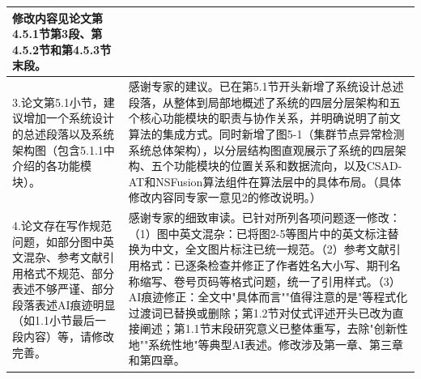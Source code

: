 \documentclass[12pt,a4paper]{article}
\begin{document}
\begin{longtable}{|p{}|p{}|}
修改内容见论文第4.5.1节第3段、第4.5.2节和第4.5.3节末段。
\\
\hline

3.论文第5.1小节，建议增加一个系统设计的总述段落以及系统架构图（包含5.1.1中介绍的各功能模块）。
&
感谢专家的建议。已在第5.1节开头新增了系统设计总述段落，从整体到局部地概述了系统的四层分层架构和五个核心功能模块的职责与协作关系，并明确说明了前文算法的集成方式。同时新增了图5-1（集群节点异常检测系统总体架构），以分层结构图直观展示了系统的四层架构、五个功能模块的位置关系和数据流向，以及CSAD-AT和NSFusion算法组件在算法层中的具体布局。（具体修改内容同专家一意见2的修改说明。）
\\
\hline

4.论文存在写作规范问题，如部分图中英文混杂、参考文献引用格式不规范、部分表述不够严谨、部分段落表述AI痕迹明显（如1.1小节最后一段内容）等，请修改完善。
&
感谢专家的细致审读。已针对所列各项问题逐一修改：（1）图中英文混杂：已将图2-5等图片中的英文标注替换为中文，全文图片标注已统一规范。（2）参考文献引用格式：已逐条检查并修正了作者姓名大小写、期刊名称缩写、卷号页码等格式问题，统一了引用样式。（3）AI痕迹修正：全文中"具体而言""值得注意的是"等程式化过渡词已替换或删除；第1.2节对仗式评述开头已改为直接阐述；第1.1节末段研究意义已整体重写，去除"创新性地""系统性地"等典型AI表述。修改涉及第一章、第三章和第四章。
\\
\hline

\end{longtable}

\vspace{10pt}

\vspace{4pt}
\end{document}

